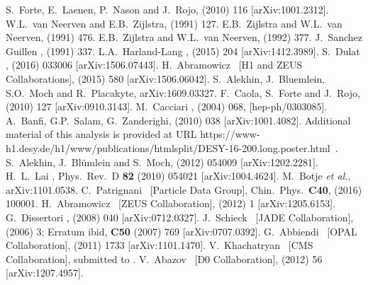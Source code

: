 \documentclass[12pt]{article}
\begin{document}
\begin{flushleft}
\begin{thebibliography}{99}
%
  S.~Forte,   E.~Laenen,   P.~Nason   and  J.~Rojo,  (2010) 116 [arXiv:1001.2312].
%
  W.L.~van Neerven and E.B.~Zijlstra,  (1991) 127.
  E.B.~Zijlstra and W.L.~van Neerven,  (1991) 476.
  E.B.~Zijlstra and W.L.~van Neerven,  (1992) 377.
  J.~Sanchez Guillen \etal,  (1991) 337.
%
  L.A.~Harland-Lang \etal,   (2015) 204 [arXiv:1412.3989].
  S.~Dulat \etal,  (2016) 033006 [arXiv:1506.07443].
 H.~Abramowicz \etal\ [H1 and ZEUS Collaborations],  (2015) 580 [arXiv:1506.06042].
  S.~Alekhin, J.~Bluemlein, S.O.~Moch and R.~Placakyte,
  arXiv:1609.03327.
%
 F.~Caola, S.~Forte and J.~Rojo,  (2010) 127 [arXiv:0910.3143].
%
 M.~Cacciari \etal,  (2004) 068, [hep-ph/0303085].
  A.~Banfi, G.P.~Salam, G.~Zanderighi,  (2010) 038 [arXiv:1001.4082].
 { Additional material of this analysis is provided
    at URL 
https://www-h1.desy.de/h1/www/publications/htmlsplit/DESY-16-200.long.poster.html\ .}
%
S.~Alekhin, J.~Bl\"umlein and S.~Moch, 
  (2012) 054009 [arXiv:1202.2281].
%
  H.~L.~Lai \etal,
  Phys.\ Rev.\ D {\bf 82} (2010) 054021
  [arXiv:1004.4624].
%
  M.~Botje {\it et al.},
  arXiv:1101.0538.
%
 C.~Patrignani \etal\ [Particle Data Group], Chin.~Phys.~{\bf C40}, (2016) 100001.
%
 H.~Abramowicz \etal\ [ZEUS Collaboration],  (2012) 1 [arXiv:1205.6153].
 G.~Dissertori \etal,  (2008) 040 [arXiv:0712.0327].
  J.~Schieck \etal\ [JADE Collaboration],  (2006) 3; Erratum ibid, {\bf C50} (2007) 769 [arXiv:0707.0392].
  G.~Abbiendi \etal\ [OPAL Collaboration],  (2011) 1733 [arXiv:1101.1470].
 V.~Khachatryan \etal\ [CMS Collaboration], submitted to \JHEP [arXiv:1609.05331].
 V.~Abazov \etal\ [D0 Collaboration],  (2012) 56 [arXiv:1207.4957].
\end{thebibliography}
\end{flushleft}
\end{document}
